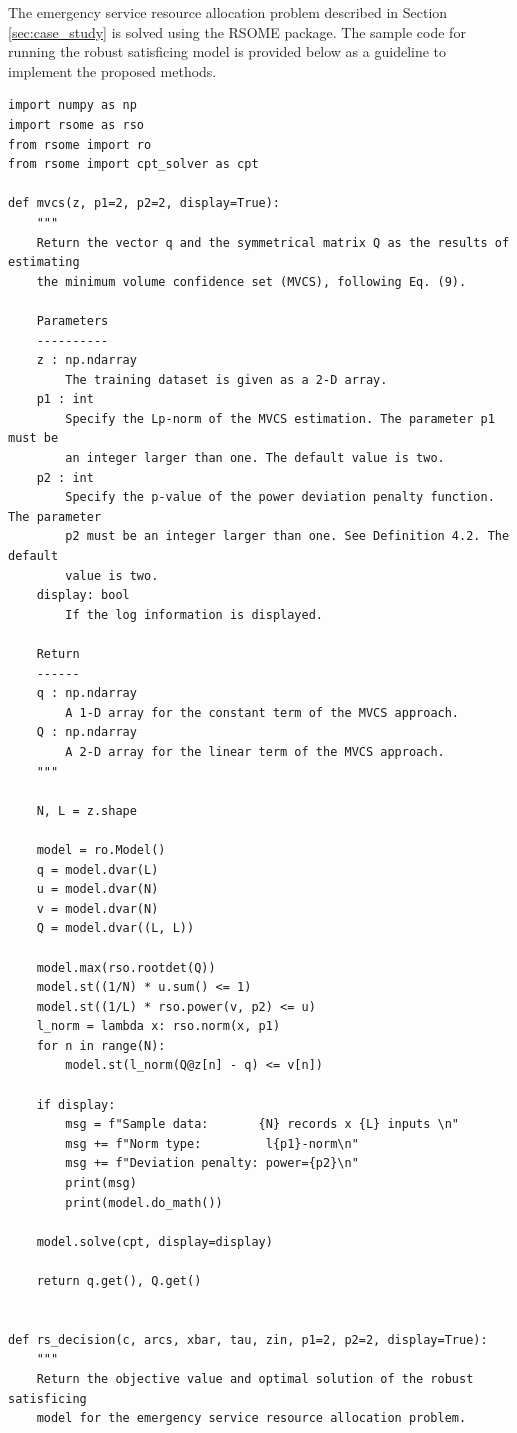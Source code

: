 \documentclass[opre, nonblindrev]{informswp}
\newcommand{\1}[1]{\mathds{1}{\left(#1\right)}}
\begin{document}
\begin{appendices}
The emergency service resource allocation problem described in Section \ref{sec:case_study} is solved using the RSOME package. The sample code for running the robust satisficing model is provided below as a guideline to implement the proposed methods.

\begin{lstlisting}
import numpy as np
import rsome as rso
from rsome import ro
from rsome import cpt_solver as cpt

def mvcs(z, p1=2, p2=2, display=True):
    """
    Return the vector q and the symmetrical matrix Q as the results of estimating
    the minimum volume confidence set (MVCS), following Eq. (9).

    Parameters
    ----------
    z : np.ndarray
        The training dataset is given as a 2-D array.
    p1 : int
        Specify the Lp-norm of the MVCS estimation. The parameter p1 must be
        an integer larger than one. The default value is two.
    p2 : int
        Specify the p-value of the power deviation penalty function. The parameter
        p2 must be an integer larger than one. See Definition 4.2. The default
        value is two.
    display: bool
        If the log information is displayed.

    Return
    ------
    q : np.ndarray
        A 1-D array for the constant term of the MVCS approach.
    Q : np.ndarray
        A 2-D array for the linear term of the MVCS approach.
    """

    N, L = z.shape

    model = ro.Model()
    q = model.dvar(L)
    u = model.dvar(N)
    v = model.dvar(N)
    Q = model.dvar((L, L))

    model.max(rso.rootdet(Q))
    model.st((1/N) * u.sum() <= 1)
    model.st((1/L) * rso.power(v, p2) <= u)
    l_norm = lambda x: rso.norm(x, p1)
    for n in range(N):
        model.st(l_norm(Q@z[n] - q) <= v[n])

    if display:
        msg = f"Sample data:       {N} records x {L} inputs \n"
        msg += f"Norm type:         l{p1}-norm\n"
        msg += f"Deviation penalty: power={p2}\n"
        print(msg)
        print(model.do_math())

    model.solve(cpt, display=display)

    return q.get(), Q.get()


def rs_decision(c, arcs, xbar, tau, zin, p1=2, p2=2, display=True):
    """
    Return the objective value and optimal solution of the robust satisficing
    model for the emergency service resource allocation problem.


\end{lstlisting}
\end{appendices}
\end{document}
